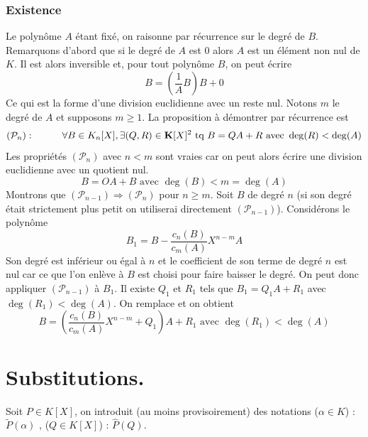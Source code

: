 \subsubsection{Existence} Le polynôme $A$ étant fixé, on raisonne par récurrence sur le degré de $B$.\newline
Remarquons d'abord que si le degré de $A$ est $0$ alors $A$ est un élément non nul de $K$. Il est alors inversible et, pour tout polynôme $B$, on peut écrire 
\begin{displaymath}
 B = (\frac{1}{A}B) B + 0
\end{displaymath}
Ce qui est la forme d'une division euclidienne avec un reste nul.
Notons $m$ le degré de $A$ et supposons $m\geq 1$. La proposition à démontrer par récurrence est
\begin{displaymath}
 (\mathcal{P}_n):\hspace{1cm}
\forall B\in K_n[X], \exists(Q,R)\in \mathbf{K}[X]^2\text{ tq } B=QA+R\text{ avec } \deg(R)<\deg(A)
\end{displaymath}
Les propriétés $(\mathcal{P}_n)$ avec $n<m$ sont vraies car on peut alors écrire une division euclidienne avec un quotient nul.
\begin{displaymath}
 B = O A + B \text{ avec } \deg(B)<m=\deg(A)
\end{displaymath}
Montrons que $(\mathcal{P}_{n-1})\Rightarrow (\mathcal{P}_n)$ pour $n\geq m$.\newline
Soit $B$ de degré $n$ (si son degré était strictement plus petit on utiliserai directement $(\mathcal{P}_{n-1})$).
Considérons le polynôme
\begin{displaymath}
 B_1 = B-\frac{c_n(B)}{c_m(A)}X^{n-m}A
\end{displaymath}
Son degré est inférieur ou égal à $n$ et le coefficient de son terme de degré $n$ est nul car ce que l'on enlève à $B$ est choisi pour faire baisser le degré. On peut donc appliquer $(\mathcal{P}_{n-1})$ à $B_1$. Il existe $Q_1$ et $R_1$ tels que $B_1=Q_1A+R_1$ avec $\deg(R_1)<\deg(A)$. On remplace et on obtient
\begin{displaymath}
 B = \left( \frac{c_n(B)}{c_m(A)}X^{n-m} + Q_1\right) A + R_1 \text{ avec } \deg(R_1)<\deg(A)
\end{displaymath}

\section{Substitutions.}
Soit $P\in K[X]$, on introduit (au moins provisoirement) des notations ($\alpha \in K$) : $\widetilde{P}(\alpha)$ , ($Q \in K[X]$) : $\widehat{P}(Q)$.

